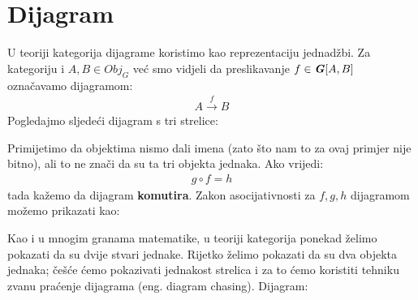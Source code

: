   \section{Dijagram}
  U teoriji kategorija dijagrame koristimo kao reprezentaciju jednadžbi.
  Za kategoriju  i $A, B \in Obj_G$ već smo vidjeli da
  preslikavanje $f \in \textbf{\emph{G}}[A, B]$ označavamo dijagramom:
  \begin{align*}
    A \xrightarrow{f} B
  \end{align*}
  Pogledajmo sljedeći dijagram s tri strelice:
  \begin{center}
  \end{center}
  Primijetimo da objektima nismo dali imena (zato što nam to za ovaj primjer nije
  bitno), ali to ne znači da su ta tri objekta jednaka. Ako vrijedi:
  \begin{align*}
    g \circ f = h
  \end{align*}
  tada kažemo da dijagram \textbf{komutira}.
  Zakon asocijativnosti za $f, g, h$ dijagramom možemo prikazati kao:
  \begin{center}
  \end{center}


  Kao i u mnogim granama matematike, u teoriji kategorija ponekad želimo
  pokazati da su dvije stvari jednake. Rijetko želimo pokazati da su dva
  objekta jednaka; češće ćemo pokazivati jednakost strelica i za to ćemo
  koristiti tehniku zvanu praćenje dijagrama (eng. diagram chasing).
  Dijagram:

